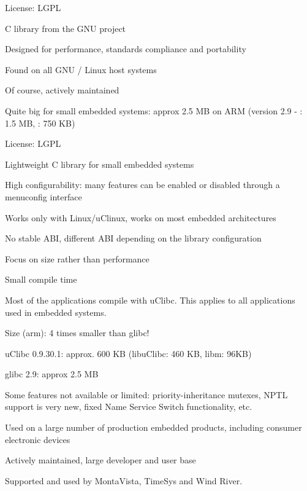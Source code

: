     \startitemize
    \item License: LGPL
    \item C library from the GNU project
    \item Designed for performance, standards compliance and portability
    \item Found on all GNU / Linux host systems
    \item Of course, actively maintained
    \item Quite big for small embedded systems: approx 2.5 MB on ARM
      (version 2.9 - : 1.5 MB, : 750 KB)
    \item {}
    \stopitemize

  \startitemize
  \item License: LGPL
  \item Lightweight C library for small embedded systems
    \startitemize
    \item High configurability: many features can be enabled or
      disabled through a menuconfig interface
    \item Works only with Linux/uClinux, works on most embedded
      architectures
    \item No stable ABI, different ABI depending on the library
      configuration
    \item Focus on size rather than performance
    \item Small compile time
    \stopitemize
  \item {}
  \stopitemize

  \startitemize
  \item Most of the applications compile with uClibc. This applies to
    all applications used in embedded systems.
  \item Size (arm): 4 times smaller than glibc!
    \startitemize
    \item uClibc 0.9.30.1: approx. 600 KB (libuClibc: 460 KB, libm:
      96KB)
    \item glibc 2.9: approx 2.5 MB
    \stopitemize
  \item Some features not available or limited: priority-inheritance
    mutexes, NPTL support is very new, fixed Name Service Switch
    functionality, etc.
  \item Used on a large number of production embedded products,
    including consumer electronic devices
  \item Actively maintained, large developer and user base
  \item Supported and used by MontaVista, TimeSys and Wind River.
\stopitemize

